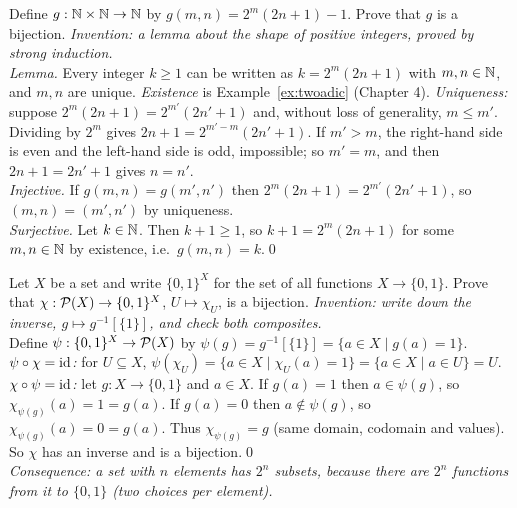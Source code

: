 \begin{bexample}\label{ex:nnbij}
Define $g:\mathbb{N}\times\mathbb{N}\to\mathbb{N}$ by $g(m,n)=2^m(2n+1)-1$. Prove that $g$ is a bijection.
\solution
\emph{Invention: a lemma about the shape of positive integers, proved by strong induction.}\\
\emph{Lemma.} Every integer $k\ge1$ can be written as $k=2^m(2n+1)$ with $m,n\in\mathbb{N}$, and $m,n$ are unique. \emph{Existence} is Example~\ref{ex:twoadic} (Chapter 4). \emph{Uniqueness:} suppose $2^m(2n+1)=2^{m'}(2n'+1)$ and, without loss of generality, $m\le m'$. Dividing by $2^m$ gives $2n+1=2^{m'-m}(2n'+1)$. If $m'>m$, the right-hand side is even and the left-hand side is odd, impossible; so $m'=m$, and then $2n+1=2n'+1$ gives $n=n'$.\\
\emph{Injective.} If $g(m,n)=g(m',n')$ then $2^m(2n+1)=2^{m'}(2n'+1)$, so $(m,n)=(m',n')$ by uniqueness.\\
\emph{Surjective.} Let $k\in\mathbb{N}$. Then $k+1\ge1$, so $k+1=2^m(2n+1)$ for some $m,n\in\mathbb{N}$ by existence, i.e.\ $g(m,n)=k$.\qed
\end{bexample}

\begin{bexample}
Let $X$ be a set and write $\{0,1\}^X$ for the set of all functions $X\to\{0,1\}$. Prove that $\chi:\mathcal{P}(X)\to\{0,1\}^X$, $U\mapsto\chi_U$, is a bijection.
\solution
\emph{Invention: write down the inverse, $g\mapsto g^{-1}[\{1\}]$, and check both composites.}\\
Define $\psi:\{0,1\}^X\to\mathcal{P}(X)$ by $\psi(g)=g^{-1}[\{1\}]=\{a\in X\mid g(a)=1\}$.\\
\emph{$\psi\circ\chi=\mathrm{id}$:} for $U\subseteq X$, $\psi(\chi_U)=\{a\in X\mid\chi_U(a)=1\}=\{a\in X\mid a\in U\}=U$.\\
\emph{$\chi\circ\psi=\mathrm{id}$:} let $g:X\to\{0,1\}$ and $a\in X$. If $g(a)=1$ then $a\in\psi(g)$, so $\chi_{\psi(g)}(a)=1=g(a)$. If $g(a)=0$ then $a\notin\psi(g)$, so $\chi_{\psi(g)}(a)=0=g(a)$. Thus $\chi_{\psi(g)}=g$ (same domain, codomain and values).\\
So $\chi$ has an inverse and is a bijection.\qed\\
\emph{Consequence: a set with $n$ elements has $2^n$ subsets, because there are $2^n$ functions from it to $\{0,1\}$ (two choices per element).}
\end{bexample}

